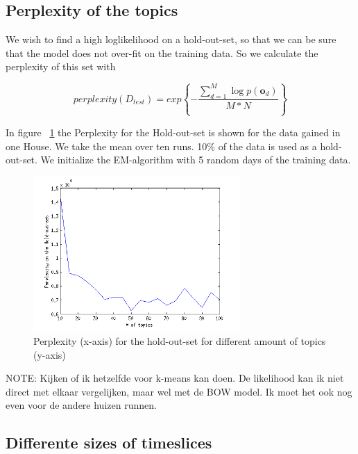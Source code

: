 \documentclass[11pt,a4paper]{article}
\begin{document}
\subsection{Perplexity of the topics}
We wish to find a high loglikelihood on a hold-out-set, so that we can be sure that the model does not over-fit on the training data. So we calculate the perplexity of this set with

\begin{equation}
 perplexity(D_{test}) = exp \left\{ - \frac{\sum_{d=1}^M \log p(\textbf{o}_d ) }{M*N} \right\}
\end{equation}

In figure ~\ref{fig:Perplexity} the Perplexity for the Hold-out-set is shown for the data gained in one House. We take the mean over ten runs. 10\% of the data is used as a hold-out-set. We initialize the EM-algorithm with 5 random days of the training data.

\begin{figure}
 \centering
 \includegraphics[width = 0.7\textwidth]{Pictures/OutcomeExp4.png}
 \caption{Perplexity (x-axis) for the hold-out-set for different amount of topics (y-axis)}
 \label{fig:Perplexity}
\end{figure}

NOTE:
Kijken of ik hetzelfde voor k-means kan doen. De likelihood kan ik niet direct met elkaar vergelijken, maar wel met de BOW model. Ik moet het ook nog even voor de andere huizen runnen.

\subsection{Differente sizes of timeslices}

% 
% 
\end{document}
